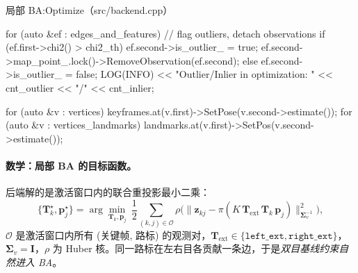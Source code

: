 \begin{codebox}[C++]{局部 BA:Optimize（src/backend.cpp）}
{    for (auto &ef : edges_and_features) {          // flag outliers, detach observations
        if (ef.first->chi2() > chi2_th) {
            ef.second->is_outlier_ = true;
            ef.second->map_point_.lock()->RemoveObservation(ef.second);
        } else {
            ef.second->is_outlier_ = false;
        }
    }
    LOG(INFO) << "Outlier/Inlier in optimization: " << cnt_outlier << "/" << cnt_inlier;

    for (auto &v : vertices)            keyframes.at(v.first)->SetPose(v.second->estimate());
    for (auto &v : vertices_landmarks)  landmarks.at(v.first)->SetPos(v.second->estimate());
}
\end{codebox}

\paragraph{数学：局部 BA 的目标函数。}
后端解的是激活窗口内的联合重投影最小二乘：
\begin{equation}
\{\mathbf{T}_k^\star,\mathbf{p}_j^\star\}=\arg\min_{\mathbf{T}_k,\mathbf{p}_j}\ \frac12\sum_{(k,j)\in\mathcal{O}}\rho\Big(\big\|\mathbf{z}_{kj}-\pi(K\,\mathbf{T}_{\mathrm{ext}}\,\mathbf{T}_k\,\mathbf{p}_j)\big\|_{\boldsymbol\Sigma_v^{-1}}^2\Big),
\label{eq:sys-localba}
\end{equation}
$\mathcal{O}$ 是激活窗口内所有 (关键帧, 路标) 的观测对，$\mathbf{T}_{\mathrm{ext}}\in\{\texttt{left\_ext},\texttt{right\_ext}\}$，$\boldsymbol\Sigma_v=\mathbf{I}$，$\rho$ 为 Huber 核。同一路标在左右目各贡献一条边，于是\emph{双目基线约束自然进入 BA}。


